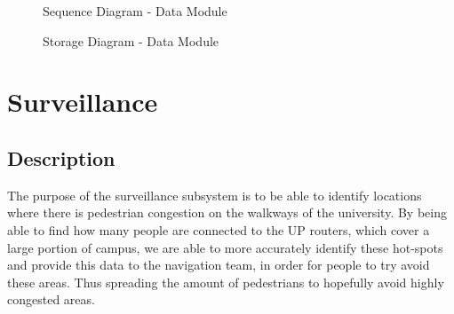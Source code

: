 \documentclass[english]{article}
\begin{document}
        \begin{figure}[H]
            \centering	            
            \centerline{}
            \caption{Sequence Diagram - Data Module}
        \end{figure} 
        
        \begin{figure}[H]
            \centering	            
            \centerline{}
            \caption{Storage Diagram - Data Module}
        \end{figure} 
        
    \section{Surveillance}    
        \subsection{Description}    
            The purpose of the surveillance subsystem is to be able to identify locations where there is pedestrian congestion on the walkways of the university.
            By being able to find how many people are connected to the UP routers, which cover a large portion of campus, we are able to more accurately identify these hot-spots and provide this data to the navigation team, in order for people to try avoid these areas. Thus spreading the amount of pedestrians to hopefully avoid highly congested areas. 
\end{document}
